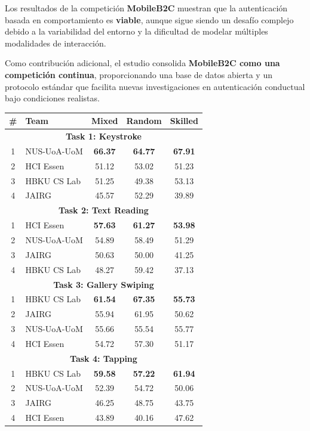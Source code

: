 Los resultados de la competición \textbf{MobileB2C} muestran que la autenticación basada en comportamiento es \textbf{viable}, aunque sigue siendo un desafío complejo debido a la variabilidad del entorno y la dificultad de modelar múltiples modalidades de interacción.

Como contribución adicional, el estudio consolida \textbf{MobileB2C como una competición continua}, proporcionando una base de datos abierta y un protocolo estándar que facilita nuevas investigaciones en autenticación conductual bajo condiciones realistas.

{\centering
{}
\label{TablaB2C}
\begin{tabular}{c l c c c}
    \toprule
    \# & Team & Mixed & Random & Skilled \\
    \midrule
    \multicolumn{5}{c}{\textbf{Task 1: Keystroke}} \\
    \midrule
    1 & NUS-UoA-UoM & \textbf{66.37} & \textbf{64.77} & \textbf{67.91} \\
    2 & HCI Essen   & 51.12 & 53.02 & 51.23 \\
    3 & HBKU CS Lab & 51.25 & 49.38 & 53.13 \\
    4 & JAIRG       & 45.57 & 52.29 & 39.89 \\
    \midrule
    \multicolumn{5}{c}{\textbf{Task 2: Text Reading}} \\
    \midrule
    1 & HCI Essen   & \textbf{57.63} & \textbf{61.27} & \textbf{53.98} \\
    2 & NUS-UoA-UoM & 54.89 & 58.49 & 51.29 \\
    3 & JAIRG       & 50.63 & 50.00 & 41.25 \\
    4 & HBKU CS Lab & 48.27 & 59.42 & 37.13 \\
    \midrule
    \multicolumn{5}{c}{\textbf{Task 3: Gallery Swiping}} \\
    \midrule
    1 & HBKU CS Lab & \textbf{61.54} & \textbf{67.35} & \textbf{55.73} \\
    2 & JAIRG       & 55.94 & 61.95 & 50.62 \\
    3 & NUS-UoA-UoM & 55.66 & 55.54 & 55.77 \\
    4 & HCI Essen   & 54.72 & 57.30 & 51.17 \\
    \midrule
    \multicolumn{5}{c}{\textbf{Task 4: Tapping}} \\
    \midrule
    1 & HBKU CS Lab & \textbf{59.58} & \textbf{57.22} & \textbf{61.94} \\
    2 & NUS-UoA-UoM & 52.39 & 54.72 & 50.06 \\
    3 & JAIRG       & 46.25 & 48.75 & 43.75 \\
    4 & HCI Essen   & 43.89 & 40.16 & 47.62 \\
    \bottomrule
\end{tabular}
\par
}

